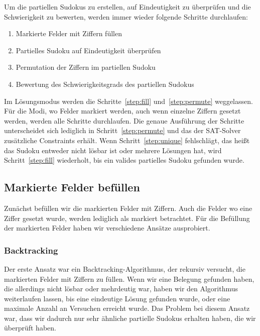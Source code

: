 Um die partiellen Sudokus zu erstellen, auf Eindeutigkeit zu überprüfen und die Schwierigkeit zu bewerten,
werden immer wieder folgende Schritte durchlaufen:
\begin{enumerate}
    \item \label{step:fill} Markierte Felder mit Ziffern füllen
    \item \label{step:unique} Partielles Sudoku auf Eindeutigkeit überprüfen
    \item \label{step:permute} Permutation der Ziffern im partiellen Sudoku
    \item \label{step:difficulty} Bewertung des Schwierigkeitsgrads des partiellen Sudokus
\end{enumerate}
Im Lösungsmodus werden die Schritte~\ref{step:fill} und~\ref{step:permute} weggelassen.
Für die Modi, wo Felder markiert werden, auch wenn einzelne Ziffern gesetzt werden, werden alle Schritte durchlaufen.
Die genaue Ausführung der Schritte unterscheidet sich lediglich in Schritt~\ref{step:permute} und das der SAT-Solver zusätzliche Constraints erhält.
Wenn Schritt~\ref{step:unique} fehlschlägt, das heißt das Sudoku entweder nicht lösbar ist oder mehrere Lösungen hat,
wird Schritt~\ref{step:fill} wiederholt, bis ein valides partielles Sudoku gefunden wurde.

\subsection{Markierte Felder befüllen}
Zunächst befüllen wir die markierten Felder mit Ziffern.
Auch die Felder wo eine Ziffer gesetzt wurde, werden lediglich als markiert betrachtet.
Für die Befüllung der markierten Felder haben wir verschiedene Ansätze ausprobiert.

\subsubsection{Backtracking}
Der erste Ansatz war ein Backtracking-Algorithmus, der rekursiv versucht, die markierten Felder mit Ziffern zu füllen.
Wenn wir eine Belegung gefunden haben, die allerdings nicht lösbar oder mehrdeutig war, haben wir den Algorithmus weiterlaufen lassen,
bis eine eindeutige Lösung gefunden wurde, oder eine maximale Anzahl an Versuchen erreicht wurde.
Das Problem bei diesem Ansatz war, dass wir dadurch nur sehr ähnliche partielle Sudokus erhalten haben,
die wir überprüft haben.

